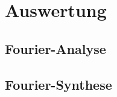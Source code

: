 \section{Auswertung}
\label{sec:Auswertung}

\subsection{Fourier-Analyse}

\subsection{Fourier-Synthese}